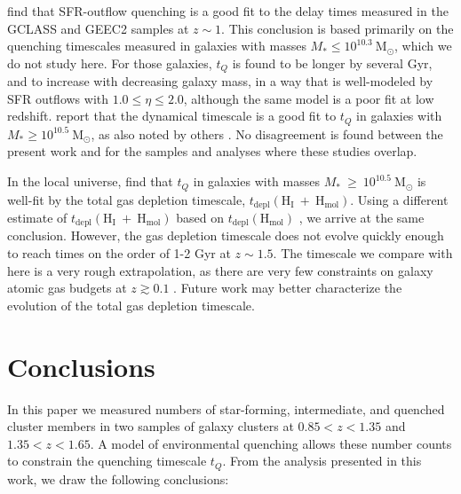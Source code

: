 \citet{Balogh:2016aa} find that SFR-outflow quenching is a good fit to the delay times measured in the GCLASS and GEEC2 samples at $z\sim1$.
This conclusion is based primarily on the quenching timescales measured in galaxies with masses $M_* \leq 10^{10.3}~ \mathrm{M}_\odot$, which we do not study here.
For those galaxies, $t_Q$ is found to be longer by several Gyr, and to increase with decreasing galaxy mass, in a way that is well-modeled by SFR outflows with $1.0 \leq \eta \leq 2.0$, although the same model is a poor fit at low redshift.
\citet{Balogh:2016aa} report that the dynamical timescale is a good fit to $t_Q$ in galaxies with $M_* \geq 10^{10.5}~ \mathrm{M}_\odot$, as also noted by others \citep{Tinker:2010aa,Mok:2014aa}.
No disagreement is found between the present work and \citet{Balogh:2016aa} for the samples and analyses where these studies overlap.

In the local universe, \citet{Fillingham:2015aa} find that $t_Q$ in galaxies with masses $M_*~\geq~10^{10.5}~\mathrm{M}_\odot$ is well-fit by the total gas depletion timescale, $t_{\mathrm{depl}}(\mathrm{H_I}~+~\mathrm{H_{mol}})$.
Using a different estimate of $t_{\mathrm{depl}}(\mathrm{H_I}~+~\mathrm{H_{mol}})$ based on $t_{\mathrm{depl}}(\mathrm{H_{mol}})$ \citep{Tacconi:2017aa}, we arrive at the same conclusion.
However, the gas depletion timescale does not evolve quickly enough to reach times on the order of 1-2 Gyr at $z\sim1.5$.
The timescale we compare with here is a very rough extrapolation, as there are very few constraints on galaxy atomic gas budgets at $z\gtrsim0.1$ \citep[see discussion in ][]{Bauermeister:2010aa}.
Future work may better characterize the evolution of the total gas depletion timescale.

\section{Conclusions}\label{sec-conclusion}

In this paper we measured numbers of star-forming, intermediate, and quenched cluster members in two samples of galaxy clusters at $0.85 < z < 1.35$ and $1.35 < z < 1.65$.
A model of environmental quenching allows these number counts to constrain the quenching timescale $t_Q$.
From the analysis presented in this work, we draw the following conclusions:

